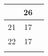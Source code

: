 \begin{table}[H]
\begin{tabularx}{\textwidth}{p{.1em}cc}
\begin{tabular}[t]{cc}
\multicolumn{1}{|c|}{23}                                                        & \multicolumn{1}{c|}{26}                                                             \\ \hline
\multicolumn{1}{|c|}{21}                                                        & \multicolumn{1}{c|}{17}                                                             \\ \hline
\multicolumn{1}{|c|}{22}                                                        & \multicolumn{1}{c|}{17}                                                             \\ \hline
\end{tabular}

\end{tabularx}\end{table}